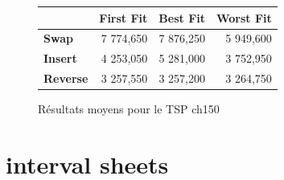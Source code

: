 \documentclass[a4paper,10pt]{report}
\begin{document}
\begin{figure}[h]
  \begin{center}
    \begin{tabular}{|l|r|r|r|}
      \hline
      &		\textbf{First Fit}&	\textbf{Best Fit}&	\textbf{Worst
Fit}\\\hline
      \textbf{Swap}&
	  7 774,650&
	  7 876,250&
	  5 949,600\\\hline
      \textbf{Insert}&
	  4 253,050&
	  5 281,000&
	  3 752,950\\\hline
      \textbf{Reverse}&
	  3 257,550&
	  3 257,200&
	  3 264,750\\\hline
    \end{tabular}
    \caption{Résultats moyens pour le TSP ch150}
  \end{center}
\end{figure}

\section{interval sheets}

\end{document}
